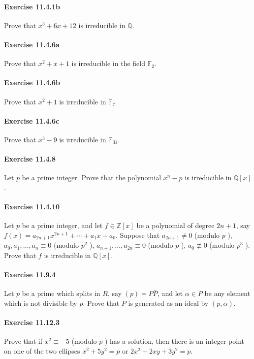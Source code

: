 \documentclass{article}
\begin{document}
\paragraph{Exercise 11.4.1b} Prove that $x^3 + 6x + 12$ is irreducible in $\mathbb{Q}$. 

\paragraph{Exercise 11.4.6a} Prove that $x^2+x+1$ is irreducible in the field $\mathbb{F}_2$. 

\paragraph{Exercise 11.4.6b} Prove that $x^2+1$ is irreducible in $\mathbb{F}_7$

\paragraph{Exercise 11.4.6c} Prove that $x^3 - 9$ is irreducible in $\mathbb{F}_{31}$. 

\paragraph{Exercise 11.4.8} Let $p$ be a prime integer. Prove that the polynomial $x^n-p$ is irreducible in $\mathbb{Q}[x]$.

\paragraph{Exercise 11.4.10} Let $p$ be a prime integer, and let $f \in \mathbb{Z}[x]$ be a polynomial of degree $2 n+1$, say $f(x)=a_{2 n+1} x^{2 n+1}+\cdots+a_1 x+a_0$. Suppose that $a_{2 n+1} \neq 0$ (modulo $p$ ), $a_0, a_1, \ldots, a_n \equiv 0$ (modulo $p^2$ ), $a_{n+1}, \ldots, a_{2 n} \equiv 0$ (modulo $p$ ), $a_0 \not\equiv 0$ (modulo $p^3$ ). Prove that $f$ is irreducible in $\mathbb{Q}[x]$. 

\paragraph{Exercise 11.9.4} Let $p$ be a prime which splits in $R$, say $(p)=P \bar{P}$, and let $\alpha \in P$ be any element which is not divisible by $p$. Prove that $P$ is generated as an ideal by $(p, \alpha)$.

\paragraph{Exercise 11.12.3} Prove that if $x^2 \equiv-5$ (modulo $p$ ) has a solution, then there is an integer point on one of the two ellipses $x^2+5 y^2=p$ or $2 x^2+2 x y+3 y^2=p$. 
\end{document}
